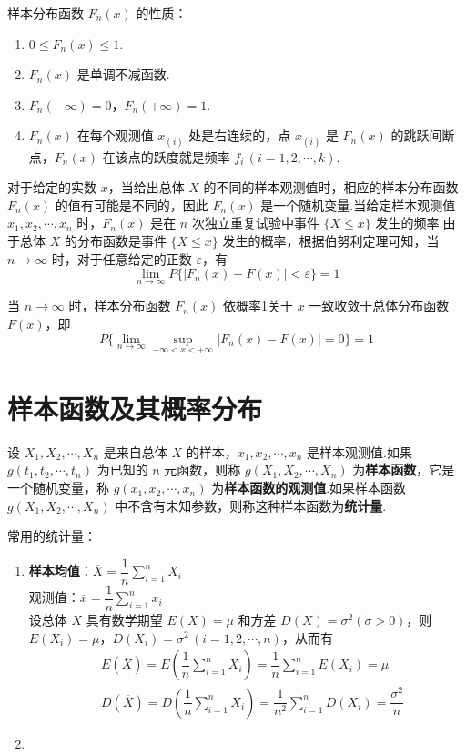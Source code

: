 样本分布函数 $F_n(x)$ 的性质：

\begin{enumerate}
    \item $0 \leqslant F_n(x) \leqslant 1$.
    \item $F_n(x)$ 是单调不减函数.
    \item $F_n(-\infty) = 0$，$F_n(+\infty) = 1$.
    \item $F_n(x)$ 在每个观测值 $x_{(i)}$ 处是右连续的，点 $x_{(i)}$ 是 $F_n(x)$ 的跳跃间断点，$F_n(x)$ 在该点的跃度就是频率 $f_i \, (i=1,2,\cdots,k)$.
\end{enumerate}

对于给定的实数 $x$，当给出总体 $X$ 的不同的样本观测值时，相应的样本分布函数 $F_n(x)$ 的值有可能是不同的，因此 $F_n(x)$ 是一个随机变量.当给定样本观测值 $x_1,x_2,\cdots,x_n$ 时，$F_n(x)$ 是在 $n$ 次独立重复试验中事件 $\{ X \leqslant x \}$ 发生的频率.由于总体 $X$ 的分布函数是事件 $\{ X \leqslant x \}$ 发生的概率，根据伯努利定理可知，当 $n \to \infty$ 时，对于任意给定的正数 $\varepsilon$，有
$$
\lim_{n \to \infty} P \{ |F_n(x) - F(x)| < \varepsilon \} = 1
$$

\begin{theorem}[（格利文科定理）]
    当 $n \to \infty$ 时，样本分布函数 $F_n(x)$ 依概率1关于 $x$ 一致收敛于总体分布函数 $F(x)$，即
    $$
    P \{ \lim_{n \to \infty} \sup_{-\infty < x < +\infty} |F_n(x) - F(x)| = 0 \} = 1
    $$
\end{theorem}

\section{样本函数及其概率分布}

\begin{definition}
    设 $X_1,X_2,\cdots,X_n$ 是来自总体 $X$ 的样本，$x_1,x_2,\cdots,x_n$ 是样本观测值.如果 $g(t_1,t_2,\cdots,t_n)$ 为已知的 $n$ 元函数，则称 $g(X_1,X_2,\cdots,X_n)$ 为\textbf{样本函数}，它是一个随机变量，称 $g(x_1,x_2,\cdots,x_n)$ 为\textbf{样本函数的观测值}.如果样本函数 $g(X_1,X_2,\cdots,X_n)$ 中不含有未知参数，则称这种样本函数为\textbf{统计量}.
\end{definition}

常用的统计量：

\begin{enumerate}
    \item \textbf{样本均值}：$\overline{X} = \dfrac{1}{n} \displaystyle\sum_{i=1}^n X_i$ \\[0.5em]
    观测值：$\overline{x} = \dfrac{1}{n} \displaystyle\sum_{i=1}^n x_i$\\[0.5em]
    设总体 $X$ 具有数学期望 $E(X) = \mu$ 和方差 $D(X) = \sigma^2 (\sigma > 0)$，则 $E(X_i) = \mu$，$D(X_i) = \sigma^2 \, (i=1,2,\cdots,n)$，从而有
    $$
    \begin{aligned}
        & E(\overline{X}) = E(\dfrac{1}{n} \sum_{i=1}^n X_i) = \dfrac{1}{n} \sum_{i=1}^n E(X_i) = \mu \\
        & D(\overline{X}) = D(\dfrac{1}{n} \sum_{i=1}^n X_i) = \dfrac{1}{n^2} \sum_{i=1}^n D(X_i) = \dfrac{\sigma^2}{n}
    \end{aligned}
    $$

    \item 
\end{enumerate}